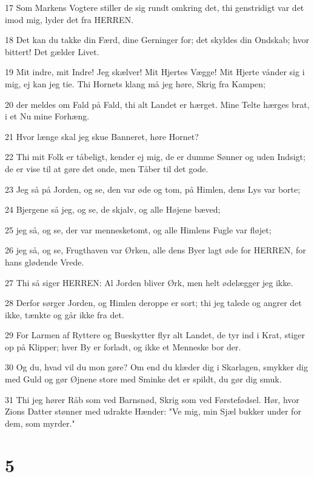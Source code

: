 \par 17 Som Markens Vogtere stiller de sig rundt omkring det, thi genstridigt var det imod mig, lyder det fra HERREN.
\par 18 Det kan du takke din Færd, dine Gerninger for; det skyldes din Ondskab; hvor bittert! Det gælder Livet.
\par 19 Mit indre, mit Indre! Jeg skælver! Mit Hjertes Vægge! Mit Hjerte vånder sig i mig, ej kan jeg tie. Thi Hornets klang må jeg høre, Skrig fra Kampen;
\par 20 der meldes om Fald på Fald, thi alt Landet er hærget. Mine Telte hærges brat, i et Nu mine Forhæng.
\par 21 Hvor længe skal jeg skue Banneret, høre Hornet?
\par 22 Thi mit Folk er tåbeligt, kender ej mig, de er dumme Sønner og uden Indsigt; de er vise til at gøre det onde, men Tåber til det gode.
\par 23 Jeg så på Jorden, og se, den var øde og tom, på Himlen, dens Lys var borte;
\par 24 Bjergene så jeg, og se, de skjalv, og alle Højene bæved;
\par 25 jeg så, og se, der var mennesketomt, og alle Himlens Fugle var fløjet;
\par 26 jeg så, og se, Frugthaven var Ørken, alle dens Byer lagt øde for HERREN, for hans glødende Vrede.
\par 27 Thi så siger HERREN: Al Jorden bliver Ørk, men helt ødelægger jeg ikke.
\par 28 Derfor sørger Jorden, og Himlen deroppe er sort; thi jeg talede og angrer det ikke, tænkte og går ikke fra det.
\par 29 For Larmen af Ryttere og Bueskytter flyr alt Landet, de tyr ind i Krat, stiger op på Klipper; hver By er forladt, og ikke et Menneske bor der.
\par 30 Og du, hvad vil du mon gøre? Om end du klæder dig i Skarlagen, smykker dig med Guld og gør Øjnene store med Sminke det er spildt, du gør dig smuk.
\par 31 Thi jeg hører Råb som ved Barnsnød, Skrig som ved Førstefødsel. Hør, hvor Zions Datter stønner med udrakte Hænder: "Ve mig, min Sjæl bukker under for dem, som myrder."

\chapter{5}

